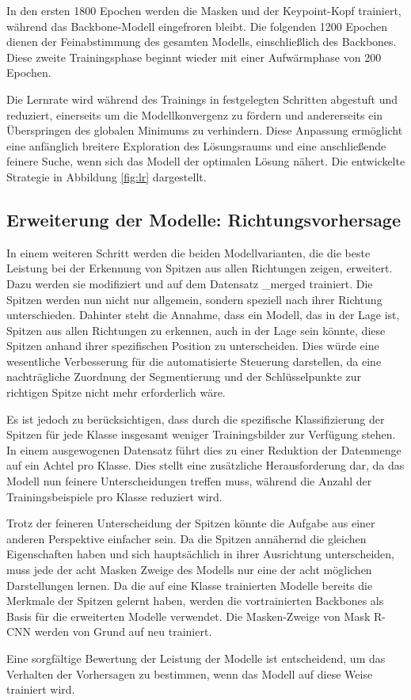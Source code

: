 In den ersten 1800 Epochen werden die Masken und der Keypoint-Kopf trainiert, während das Backbone-Modell eingefroren bleibt. Die folgenden 1200 Epochen dienen der Feinabstimmung des gesamten Modells, einschließlich des Backbones. Diese zweite Trainingsphase beginnt wieder mit einer Aufwärmphase von 200 Epochen.

Die Lernrate wird während des Trainings in festgelegten Schritten abgestuft und reduziert, einerseits um die Modellkonvergenz zu fördern und andererseits ein Überspringen des globalen Minimums zu verhindern. Diese Anpassung ermöglicht eine anfänglich breitere Exploration des Lösungsraums und eine anschließende feinere Suche, wenn sich das Modell der optimalen Lösung nähert. Die entwickelte Strategie in Abbildung \ref{fig:lr} dargestellt.
\subsection{Erweiterung der Modelle: Richtungsvorhersage}
In einem weiteren Schritt werden die beiden Modellvarianten, die die beste Leistung bei der Erkennung von Spitzen aus allen Richtungen zeigen, erweitert. Dazu werden sie modifiziert und auf dem Datensatz \_merged\grqq{} trainiert. Die Spitzen werden nun nicht nur allgemein, sondern speziell nach ihrer Richtung unterschieden. Dahinter steht die Annahme, dass ein Modell, das in der Lage ist, Spitzen aus allen Richtungen zu erkennen, auch in der Lage sein könnte, diese Spitzen anhand ihrer spezifischen Position zu unterscheiden. Dies würde eine wesentliche Verbesserung für die automatisierte Steuerung darstellen, da eine nachträgliche Zuordnung der Segmentierung und der Schlüsselpunkte zur richtigen Spitze nicht mehr erforderlich wäre.

Es ist jedoch zu berücksichtigen, dass durch die spezifische Klassifizierung der Spitzen für jede Klasse insgesamt weniger Trainingsbilder zur Verfügung stehen. In einem ausgewogenen Datensatz führt dies zu einer Reduktion der Datenmenge auf ein Achtel pro Klasse. Dies stellt eine zusätzliche Herausforderung dar, da das Modell nun feinere Unterscheidungen treffen muss, während die Anzahl der Trainingsbeispiele pro Klasse reduziert wird.

Trotz der feineren Unterscheidung der Spitzen könnte die Aufgabe aus einer anderen Perspektive einfacher sein.
Da die Spitzen annähernd die gleichen Eigenschaften haben und sich hauptsächlich in ihrer Ausrichtung unterscheiden, muss jede der acht Masken Zweige des Modells nur eine der acht möglichen Darstellungen lernen. Da die auf eine Klasse trainierten Modelle bereits die Merkmale der Spitzen gelernt haben, werden die vortrainierten Backbones als Basis für die erweiterten Modelle verwendet. Die Masken-Zweige von Mask R-CNN werden von Grund auf neu trainiert.

Eine sorgfältige Bewertung der Leistung der Modelle ist entscheidend, um das Verhalten der Vorhersagen zu bestimmen, wenn das Modell auf diese Weise trainiert wird.